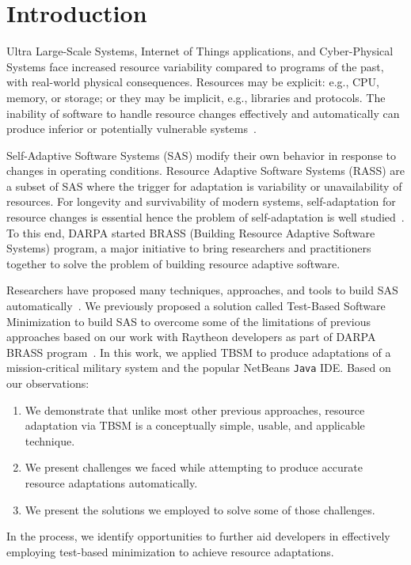 \section{Introduction}

Ultra Large-Scale Systems, Internet of Things applications, and Cyber-Physical Systems face increased resource variability compared to programs of the past, with real-world physical consequences.  Resources may be explicit: e.g., CPU, memory, or storage; or they may be implicit, e.g., libraries and protocols. The inability of software to handle resource changes effectively and automatically can produce inferior or potentially vulnerable systems~\cite{hughes2016building}. 

Self-Adaptive Software Systems (SAS) modify their own behavior in response to changes in operating conditions. Resource Adaptive Software Systems (RASS) are a subset of SAS where the trigger for adaptation is variability or unavailability of resources. For longevity and survivability of modern systems, self-adaptation for resource changes is essential hence the problem of self-adaptation is well studied~\cite{seams2018keynote}. To this end, DARPA started BRASS (Building Resource Adaptive Software Systems) program, a major initiative to bring researchers and practitioners together to solve the problem of building resource adaptive software. 

Researchers have proposed many techniques, approaches, and tools to build SAS automatically~\cite{hughes2016building,salehie2009selfadaptive,krupitzer2015a}. We previously proposed a solution called Test-Based Software Minimization to build SAS to overcome some of the limitations of previous approaches based on our work with Raytheon developers as part of DARPA BRASS program~\cite{christi2017saso}. In this work, we applied TBSM to produce adaptations of a mission-critical military system and the popular NetBeans \texttt{Java} IDE.  Based on our observations: 
\begin{enumerate}
\item {We demonstrate that unlike most other previous approaches, resource adaptation via TBSM is a conceptually simple, usable, and applicable technique. }
\item {We present challenges we faced while attempting to produce accurate resource adaptations automatically. }
\item {We present the solutions we employed to solve some of those challenges. }
\end{enumerate}

In the process, we identify opportunities to further aid developers in effectively employing test-based minimization to achieve resource adaptations. 





